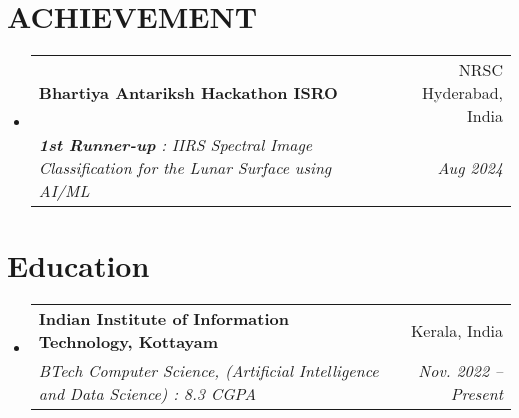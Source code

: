 \documentclass[letterpaper,11pt]{article}
\makeatletter
\newcommand{\resumeSubheading}[4]{
  \vspace{-2pt}\item
    \begin{tabular*}{0.97\textwidth}[t]{l@{\extracolsep{\fill}}r}
      \textbf{#1} & #2 \\
      \textit{\small#3} & \textit{\small #4} \\
    \end{tabular*}\vspace{-7pt}
}
\newcommand{\resumeSubHeadingListStart}{\begin{itemize}[leftmargin=0.15in, label={}]}
\newcommand{\resumeSubHeadingListEnd}{\end{itemize}}
\makeatother
\begin{document}
\section{ACHIEVEMENT}
  \resumeSubHeadingListStart
    \resumeSubheading
      {Bhartiya Antariksh Hackathon ISRO}{NRSC Hyderabad, India}
      {\textbf{1st Runner-up} : IIRS Spectral Image Classification for the Lunar Surface using AI/ML}{Aug 2024}
  \resumeSubHeadingListEnd


\section{Education}
  \resumeSubHeadingListStart
    \resumeSubheading
      {Indian Institute of Information Technology, Kottayam}{Kerala, India}
      {BTech Computer Science, (Artificial Intelligence and Data Science) : 8.3 CGPA}{Nov. 2022 -- Present}
  \resumeSubHeadingListEnd

\end{document}
